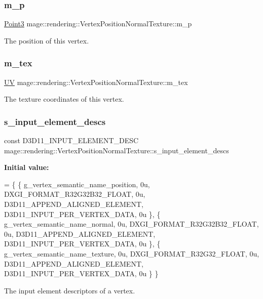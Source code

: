 \subsubsection{\texorpdfstring{m\+\_\+p}{m\_p}}
{\footnotesize\ttfamily \hyperlink{structmage_1_1_point3}{Point3} mage\+::rendering\+::\+Vertex\+Position\+Normal\+Texture\+::m\+\_\+p}

The position of this vertex. \hypertarget{structmage_1_1rendering_1_1_vertex_position_normal_texture_a8390daa0e3fd706ff42b32a62a935c3c}{}\label{structmage_1_1rendering_1_1_vertex_position_normal_texture_a8390daa0e3fd706ff42b32a62a935c3c} 
\subsubsection{\texorpdfstring{m\+\_\+tex}{m\_tex}}
{\footnotesize\ttfamily \hyperlink{structmage_1_1_u_v}{UV} mage\+::rendering\+::\+Vertex\+Position\+Normal\+Texture\+::m\+\_\+tex}

The texture coordinates of this vertex. \hypertarget{structmage_1_1rendering_1_1_vertex_position_normal_texture_a5f3ec0cb5a7957fda248bad573caee44}{}\label{structmage_1_1rendering_1_1_vertex_position_normal_texture_a5f3ec0cb5a7957fda248bad573caee44} 
\subsubsection{\texorpdfstring{s\+\_\+input\+\_\+element\+\_\+descs}{s\_input\_element\_descs}}
{\footnotesize\ttfamily const D3\+D11\+\_\+\+I\+N\+P\+U\+T\+\_\+\+E\+L\+E\+M\+E\+N\+T\+\_\+\+D\+E\+SC mage\+::rendering\+::\+Vertex\+Position\+Normal\+Texture\+::s\+\_\+input\+\_\+element\+\_\+descs\hspace{0.3cm}{\ttfamily [static]}}

{\bfseries Initial value\+:}
\begin{DoxyCode}
= \{
        \{ g\_vertex\_semantic\_name\_position, 0u, DXGI\_FORMAT\_R32G32B32\_FLOAT,    0u, 
      D3D11\_APPEND\_ALIGNED\_ELEMENT, D3D11\_INPUT\_PER\_VERTEX\_DATA, 0u \},
        \{ g\_vertex\_semantic\_name\_normal,   0u, DXGI\_FORMAT\_R32G32B32\_FLOAT,    0u, 
      D3D11\_APPEND\_ALIGNED\_ELEMENT, D3D11\_INPUT\_PER\_VERTEX\_DATA, 0u \},
        \{ g\_vertex\_semantic\_name\_texture,  0u, DXGI\_FORMAT\_R32G32\_FLOAT,       0u, 
      D3D11\_APPEND\_ALIGNED\_ELEMENT, D3D11\_INPUT\_PER\_VERTEX\_DATA, 0u \}
    \}
\end{DoxyCode}
The input element descriptors of a vertex. 